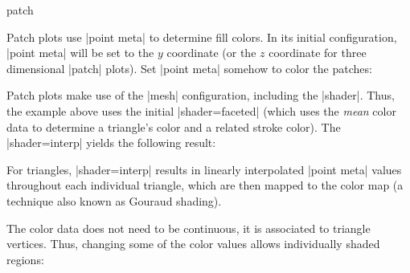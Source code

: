 {\begin{plottype}[/pgfplots]{patch}
\begin{codeexample}[]
\end{codeexample}
	\noindent Patch plots use |point meta| to determine fill colors. In its initial configuration, |point meta| will be set to the $y$ coordinate (or the $z$ coordinate for three dimensional |patch| plots). Set |point meta| somehow to color the patches:
\begin{codeexample}[]
\end{codeexample}
	Patch plots make use of the |mesh| configuration, including the |shader|. Thus, the example above uses the initial |shader=faceted| (which uses the \emph{mean} color data to determine a triangle's color and a related stroke color). The |shader=interp| yields the following result:
{%
\begin{codeexample}[]
\end{codeexample}
}%
	\noindent For triangles, |shader=interp| results in linearly interpolated |point meta| values throughout each individual triangle, which are then mapped to the color map (a technique also known as Gouraud shading).

	The color data does not need to be continuous, it is associated to triangle vertices. Thus, changing some of the color values allows individually shaded regions:
\begin{codeexample}[]
\end{codeexample}
\end{plottype}}
